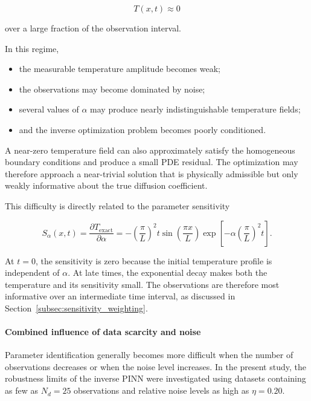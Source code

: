 \begin{equation}
T(x,t)
\approx 0
\end{equation}

over a large fraction of the observation interval.

In this regime,

\begin{itemize}
    \item the measurable temperature amplitude becomes weak;
    \item the observations may become dominated by noise;
    \item several values of $\alpha$ may produce nearly indistinguishable
    temperature fields;
    \item and the inverse optimization problem becomes poorly conditioned.
\end{itemize}

A near-zero temperature field can also approximately satisfy the homogeneous
boundary conditions and produce a small PDE residual. The optimization may
therefore approach a near-trivial solution that is physically admissible but
only weakly informative about the true diffusion coefficient.

This difficulty is directly related to the parameter sensitivity

\begin{equation}
S_{\alpha}(x,t)
=
\frac{\partial T_{\mathrm{exact}}}{\partial\alpha}
=
-
\left(\frac{\pi}{L}\right)^2
t
\sin\left(\frac{\pi x}{L}\right)
\exp\left[
-\alpha
\left(\frac{\pi}{L}\right)^2t
\right].
\end{equation}

At $t=0$, the sensitivity is zero because the initial temperature profile is
independent of $\alpha$. At late times, the exponential decay makes both the
temperature and its sensitivity small. The observations are therefore most
informative over an intermediate time interval, as discussed in
Section~\ref{subsec:sensitivity_weighting}.

\paragraph{Combined influence of data scarcity and noise}

Parameter identification generally becomes more difficult when the number of
observations decreases or when the noise level increases. In the present study,
the robustness limits of the inverse PINN were investigated using datasets
containing as few as $N_d=25$ observations and relative noise levels as high as
$\eta=0.20$.

